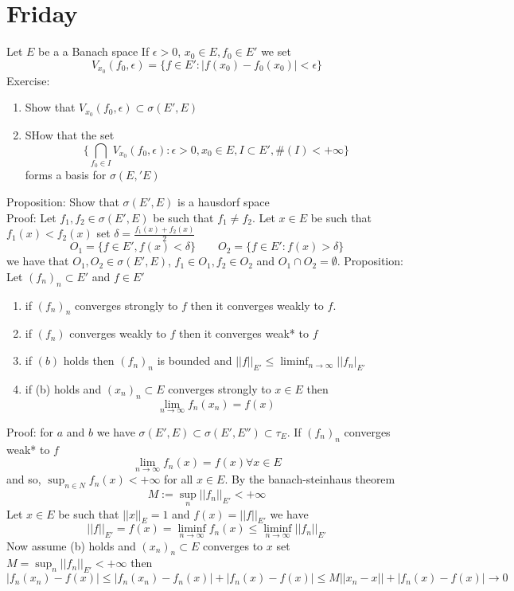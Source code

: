 \documentclass[11pt]{article}
\begin{document}
\section{Friday }
Let $E$ be a a Banach space
If $\epsilon >0$, $x_0 \in E, f_0 \in E'$ we set
\[
    V_{x_0}(f_0, \epsilon) = \{f \in E' : |f(x_0) - f_0(x_0) | < \epsilon\}  
\] 
Exercise: \begin{enumerate}
    \item Show that $V_{x_0}(f_0, \epsilon) \subset \sigma(E', E)$
    \item SHow that the set 
        \[
            \{\bigcap_{f_0 \in I} V_{x_0}(f_0, \epsilon): \epsilon > 0, x_0 \in E, I \subset E', \#(I) < +\infty\}
        \] 
        forms a basis for $\sigma(E,' E)$
\end{enumerate}
Proposition: Show that $\sigma(E', E)$ is a hausdorf space\\
Proof: Let $f_1, f_2 \in \sigma(E', E)$ be such that $f_1 \ne f_2$.
Let $x \in E$ be such that  $f_1(x) < f_2(x)$ set $\delta = \frac{f_1(x) + f_2(x)}{2}$
\[
    O_1 = \{f \in E', f(x) < \delta\} \qquad O_2 =\{f \in E': f(x) > \delta\}
\] 
we have that $O_1,O_2 \in \sigma(E', E)$, $f_1 \in O_1, f_2 \in O_2$ and $O_1 \cap O_2 = \emptyset$.
Proposition: Let $(f_n)_n \subset E'$ and $f \in E'$
 \begin{enumerate}
     \item if $(f_n)_n$ converges strongly to  $f$ then it converges weakly to $f$.
     \item if  $(f_n)$ converges weakly to  $f$ then it converges weak* to $f$ 
     \item if $(b)$ holds then  $(f_n)_n$ is bounded and  $||f||_{E'} \le \liminf_{n\to \infty}||f_n|_{E'}$ 
     \item if (b) holds and $(x_n)_n \subset E$ converges strongly to $x \in E$ then
          \[
         \lim_{n\to \infty}f_n(x_n) = f(x)
         \] 
\end{enumerate}
Proof: for $a$ and $b$ we have $\sigma(E', E) \subset \sigma(E', E'') \subset \tau_E$.
If $(f_n)_n$ converges weak* to  $f$ 
\[
\lim_{n\to \infty}f_n(x) = f(x) \forall x \in E
\] 
and so, $\sup_{n \in N}f_n(x) < +\infty$ for all $x \in E$.
By the banach-steinhaus theorem
\[
    M := \sup_{n} ||f_n||_{E'} < +\infty
\] 
Let $x \in E$ be such that  $||x||_E = 1$ and  $f(x) = ||f||_{E'}$ we have
 \[
     ||f||_{E'} = f(x) = \liminf_{n\to \infty} f_n(x) \le \liminf_{n\to \infty} ||f_n||_{E'}
\] 
Now assume (b) holds and $(x_n)_n \subset E$ converges to $x$ set  $M = \sup_{n} ||f_n||_{E'} < +\infty$ then
\[
|f_n(x_n) - f(x)| \le |f_n(x_n) - f_n(x)| + |f_n(x) - f(x)| \le M||x_n - x||  + |f_n(x) - f(x)| \rightarrow 0
\] 
\end{document}
